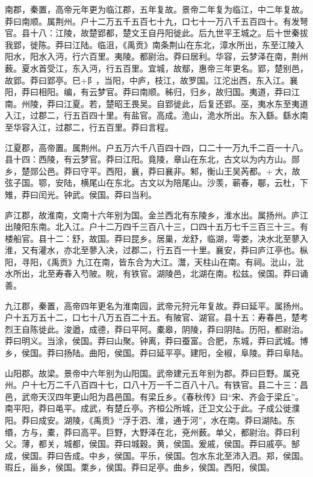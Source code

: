 \documentclass[12pt,UTF8]{ctexbook}
\begin{document}
南郡，秦置，高帝元年更为临江郡，五年复故。景帝二年复为临江，中二年复故。莽曰南顺。属荆州。户十二万五千五百七十九，口七十一万八千五百四十。有发弩官。县十八：江陵，故楚郢都，楚文王自丹阳徙此。后九世平王城之。后十世秦拔我郢，徙陈。莽曰江陆。临沮，《禹贡》南条荆山在东北，漳水所出，东至江陵入阳水，阳水入沔，行六百里。夷陵。都尉治。莽曰居利。华容，云梦泽在南，荆州薮。夏水首受江，东入沔，行五百里。宜城，故鄢，惠帝三年更名。郢，楚别邑，故郢。莽曰郢亭。巳+阝，当阳，中庐，枝江，故罗国。江沱出西，东入江。襄阳，莽曰相阳。编，有云梦官。莽曰南顺。秭归，归乡，故归国。夷道，莽曰江南。州陵，莽曰江夏。若，楚昭王畏吴。自郢徙此，后复还郢。巫，夷水东至夷道入江，过郡二，行五百四十里。有盐官。高成。洈山，洈水所出。东入繇。繇水南至华容入江，过郡二，行五百里。莽曰言程。



江夏郡，高帝置。属荆州。户五万六千八百四十四，口二十一万九千二百一十八。县十四：西陵，有云梦官。莽曰江阳。竟陵，章山在东北，古文以为内方山。郧乡，楚郧公邑。莽曰守平。西阳，襄，莽曰襄非。邾，衡山王吴芮都。+大，故弦子国。鄂，安陆，横尾山在东北。古文以为陪尾山。沙羡，蕲春，鄳，云杜，下雉，莽曰闰光。钟武。侯国。莽曰当利。



庐江郡，故淮南，文南十六年别为国。金兰西北有东陵乡，淮水出。属扬州。庐江出陵阳东南。北入江。户十二万四千三百八十三，口四十五万七千三百三十三。有楼船官。县十二：舒，故国。莽曰昆乡。居巢，龙舒，临湖，雩娄，决水北至蓼入淮，又有灌水，亦北至蓼入决，过郡二，行五百一十里。襄安，莽曰庐江亭也。枞阳，寻阳，《禹贡》九江在南，皆东合为大江。灊，天柱山在南。有祠。沘山，沘水所出，北至寿春入芍陂。睆，有铁官。湖陵邑，北湖在南。松兹。侯国。莽曰诵善。



九江郡，秦置，高帝四年更名为淮南园，武帝元狩元年复故。莽曰延平。属扬州。户十五万五十二，口七十八万五百二十五。有陂官、湖官。县十五：寿春邑，楚考烈王自陈徙此。浚遒，成德，莽曰平阿。橐皋，阴陵，莽曰阴陆。历阳，都尉治。莽曰明义。当涂，侯国。莽曰山聚。钟离，莽曰蚕富。合肥，东城，莽曰武城。博乡，侯国。莽曰扬陆。曲阳，侯国。莽曰延平亭。建阳，全椒，阜陵。莽曰阜陆。



山阳郡。故梁。景帝中六年别为山阳国。武帝建元五年别为郡。莽曰巨野。属兗州。户十七万二千八百四十七，口八十万一千二百八十八。有铁官。县二十三：昌邑，武帝天汉四年更山阳为昌邑国。有梁丘乡。《春秋传》曰“宋、齐会于梁丘”。南平阳，莽曰黾平。成武，有楚丘亭。齐桓公所城，迁卫文公于此。子成公徙濮阳。莽曰成安。湖陵，《禹贡》“浮于泗、淮，通于河”，水在南。莽曰湖陆。东缗，方与，橐，莽曰高平。巨野，大野泽在北，兗州薮。单父，都尉治。莽曰利父。薄，都关，城都，侯国。莽曰城穀。黄，侯国。爰戚，侯国。莽曰戚亭。郜成，侯国。莽曰告成。中乡，侯国。平乐，侯国。包水东北至沛入泗。郑，侯国。瑕丘，甾乡，侯国。栗乡，侯国。莽曰足亭。曲乡，侯国。西阳，侯国。
\end{document}
